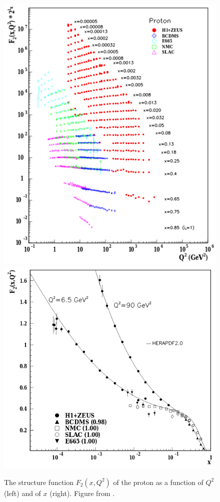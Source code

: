 \begin{figure}[t]
  \includegraphics[width=0.45\linewidth]{proton_f2.png}
  \includegraphics[width=0.54\linewidth]{proton_f2_vs_x.png}
  \caption{The structure function $F_2\left(x, Q^2\right)$ of the proton as a function of $Q^2$ (left) and of $x$ (right). Figure from .}
  \label{fig:proton_f2}
\end{figure}


